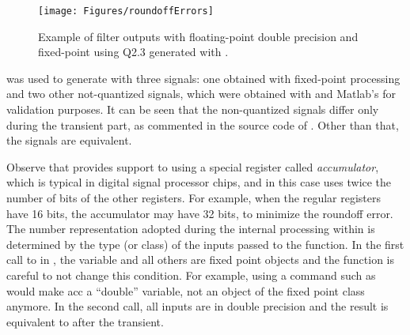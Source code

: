 




\begin{figure}
\centering
\texttt{[image: Figures/roundoffErrors]}
\caption{Example of filter outputs with floating-point double precision and fixed-point using Q2.3 generated with .\label{fig:roundoffErrors}}
\end{figure}

 was used to generate  with three signals: one obtained with fixed-point processing and two other not-quantized signals, which were obtained with  and Matlab's  for validation purposes. It can be seen that the non-quantized signals differ only during the transient part, as commented in the source code of . Other than that, the signals are equivalent. 

Observe that  provides support to using a special register called \emph{accumulator}, which is typical in digital signal processor chips, and in this case uses twice the number of bits of the other registers. For example, when the regular registers have 16 bits, the accumulator may have 32 bits, to minimize the roundoff error. The number representation adopted during the internal processing within  is determined by the type (or class) of the inputs passed to the function. In the first call to  in , the variable  and all others are fixed point objects and the function is careful to not change this condition. For example, using a command such as  would make acc a ``double'' variable, not an object of the fixed point class anymore. In the second call, all  inputs are in double precision and the result is equivalent to  after the transient.

